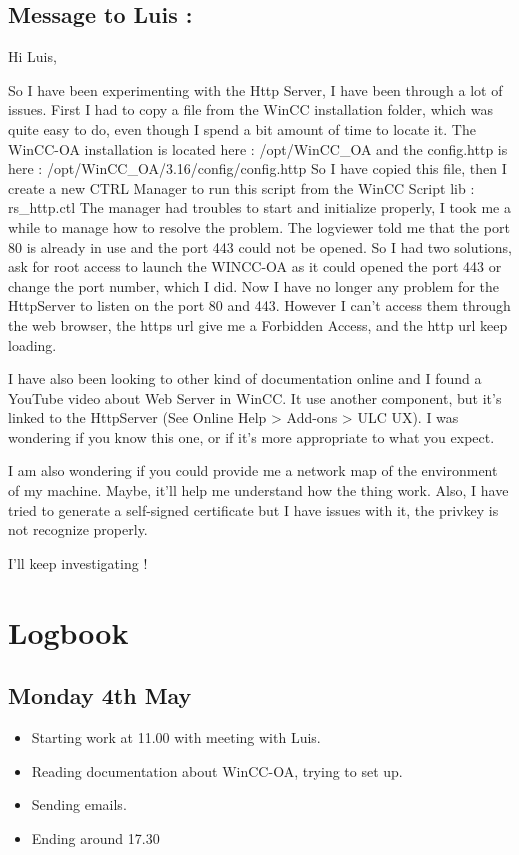 \documentclass[a4paper, 10pt]{article}
\begin{document}
\subsection*{Message to Luis :}

Hi Luis,

So I have been experimenting with the Http Server, I have been through a lot of issues.
First I had to copy a file from the WinCC installation folder, which was quite easy to do, even though I spend a bit amount of time to locate it.
The WinCC-OA installation is located here : /opt/WinCC\_OA and the config.http is here : /opt/WinCC\_OA/3.16/config/config.http
So I have copied this file, then I create a new CTRL Manager to run this script from the WinCC Script lib : rs_http.ctl
The manager had troubles to start and initialize properly, I took me a while to manage how to resolve the problem.
The logviewer told me that the port 80 is already in use and the port 443 could not be opened.
So I had two solutions, ask for root access to launch the WINCC-OA as it could opened the port 443 or change the port number, which I did.
Now I have no longer any problem for the HttpServer to listen on the port 80 and 443.
However I can't access them through the web browser, the https url give me a Forbidden Access, and the http url keep loading.

I have also been looking to other kind of documentation online and I found a YouTube video about Web Server in WinCC. 
It use another component, but it's linked to the HttpServer (See Online Help > Add-ons > ULC UX).
I was wondering if you know this one, or if it's more appropriate to what you expect.

I am also wondering if you could provide me a network map of the environment of my machine. Maybe, it'll help me understand how the thing work.
Also, I have tried to generate a self-signed certificate but I have issues with it, the privkey is not recognize properly.

I'll keep investigating !

\newpage

\section{Logbook}
\subsection*{Monday 4th May}
\begin{itemize}
    \item Starting work at 11.00 with meeting with Luis.
    \item Reading documentation about WinCC-OA, trying to set up.
    \item Sending emails.
    \item Ending around 17.30
\end{itemize}
\end{document}
